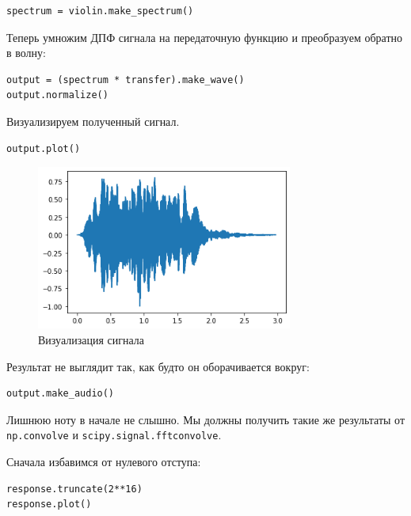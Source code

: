 \documentclass[a4paper,12pt]{report}
\begin{document}
\begin{lstlisting}[caption=Спектр сигнала]
spectrum = violin.make_spectrum()
\end{lstlisting}

Теперь умножим ДПФ сигнала на передаточную функцию и преобразуем обратно в волну:

\begin{lstlisting}[caption=Совмещение сигналов]
output = (spectrum * transfer).make_wave()
output.normalize()
\end{lstlisting}

Визуализируем полученный сигнал.

\begin{lstlisting}[caption=Визуализация сигнала]
output.plot()
\end{lstlisting}

\begin{figure}[H]
        \centering
        \includegraphics[width=0.75\textwidth]{lab10_fig1_4.png}
        \caption{Визуализация сигнала}
        \label{fig:lab10_fig1_4}
\end{figure}

Результат не выглядит так, как будто он оборачивается вокруг:

\begin{lstlisting}[caption=Прослушивание сигнала]
output.make_audio()
\end{lstlisting}

Лишнюю ноту в начале не слышно. Мы должны получить такие же результаты от \texttt{np.convolve} и \texttt{scipy.signal.fftconvolve}.

Сначала избавимся от нулевого отступа:

\begin{lstlisting}[caption=Избавление от нулевого отступа]
response.truncate(2**16)
response.plot()
\end{lstlisting}
\end{document}
